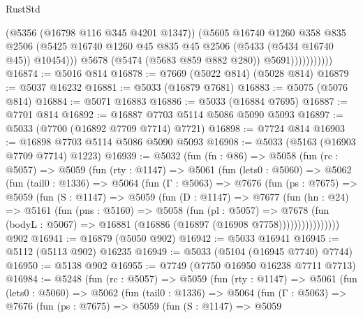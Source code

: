 \begin{lexlean}{RustStd}
\begin{coremodule}
                            (@5356 (@16798 @116 @345 @4201 @1347))
                            (@5605
                              @16740
                              @1260
                              @358
                              @835
                              @2506
                              (@5425
                                @16740
                                @1260
                                @45
                                @835
                                @45
                                @2506
                                (@5433 (@5434 @16740 @45))
                                @10454)))
                          @5678
                          (@5474 (@5683 @859 @882 @280))
                          @5691)))))))))))
@16874 := @5016 @814
@16878 := @7669 (@5022 @814) (@5028 @814)
@16879 := @5037 @16232
@16881 := @5033 (@16879 @7681)
@16883 := @5075 (@5076 @814)
@16884 := @5071 @16883
@16886 := @5033 (@16884 @7695)
@16887 := @7701 @814
@16892 := @16887 @7703 @5114 @5086 @5090 @5093
@16897 := @5033 (@7700 (@16892 @7709 @7714) @7721)
@16898 := @7724 @814
@16903 := @16898 @7703 @5114 @5086 @5090 @5093
@16908 := @5033 (@5163 (@16903 @7709 @7714) @1223)
@16939 := @5032
    (fun (fn : @86) =>
    @5058
      (fun (rc : @5057) =>
      @5059
        (fun (rty : @1147) =>
        @5061
          (fun (lets0 : @5060) =>
          @5062
            (fun (tail0 : @1336) =>
            @5064
              (fun (Γ : @5063) =>
              @7676
                (fun (ps : @7675) =>
                @5059
                  (fun (S : @1147) =>
                  @5059
                    (fun (D : @1147) =>
                    @7677
                      (fun (hn : @24) =>
                      @5161
                        (fun (pns : @5160) =>
                        @5058
                          (fun (pl : @5057) =>
                          @7678
                            (fun (bodyL : @5067) =>
                            @16881 (@16886 (@16897 (@16908 @7758))))))))))))))))
    @902
@16941 := @16879 (@5050 @902)
@16942 := @5033 @16941
@16945 := @5112 (@5113 @902) @16235
@16949 := @5033 (@5104 (@16945 @7740) @7744)
@16950 := @5138 @902
@16955 := @7749 (@7750 @16950 @16238 @7711 @7713)
@16984 := @5248
    (fun (rc : @5057) =>
    @5059
      (fun (rty : @1147) =>
      @5061
        (fun (lets0 : @5060) =>
        @5062
          (fun (tail0 : @1336) =>
          @5064
            (fun (Γ : @5063) =>
            @7676
              (fun (ps : @7675) =>
              @5059
                (fun (S : @1147) =>
                @5059

\end{coremodule}
\end{lexlean}
